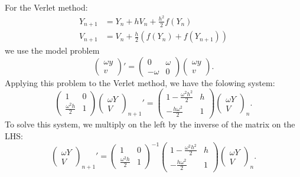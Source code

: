 \documentclass[11pt]{article}
\def\f{\frac }
\begin{document}
\begin{enumerate}
For the Verlet method:
\begin{align*} Y_{n+1} &= Y_n + hV_n + \f{h^2}{2} f(Y_n) \\
V_{n+1} &= V_n + \f{h}{2} \left ( f( Y_n) + f( Y_{n+1})\right )  \end{align*}
we use the model problem
\[ \left ( \begin{array}{c}  \omega y \\ v  \end{array} \right ) ' = \left ( \begin{array}{cc}  0 & \omega \\ -\omega & 0   \end{array} \right ) \left ( \begin{array}{c}  \omega y \\ v   \end{array} \right ). \]
Applying this problem to the Verlet method, we have the folowing system:
\[ \left ( \begin{array}{cc}  1 & 0 \\ \f{\omega ^2 h}{2} & 1 \end{array} \right ) \left ( \begin{array}{c}  \omega Y \\ V \end{array} \right )_{n+1} ' = \left ( \begin{array}{cc}  1 - \f{\omega ^2 h^2}{2} & h \\ -\f{h\omega^2}{2} & 1 \end{array} \right ) \left ( \begin{array}{c} \omega Y \\ V \end{array} \right ) _n. \]
To solve this system, we multiply on the left by the inverse of the matrix on the LHS:
\[  \left ( \begin{array}{c}  \omega Y \\ V \end{array} \right )_{n+1} ' = \left ( \begin{array}{cc}  1 & 0 \\ \f{\omega ^2 h}{2} & 1 \end{array} \right ) ^{-1} \left ( \begin{array}{cc}  1 - \f{\omega ^2 h^2}{2} & h \\ -\f{h\omega^2}{2} & 1 \end{array} \right ) \left ( \begin{array}{c} \omega Y \\ V \end{array} \right ) _n. \]

\end{enumerate}
\end{document}
